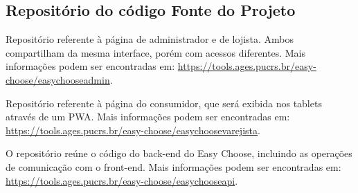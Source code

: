 \hypertarget{__RefHeading___Toc4733_3118176633}{}
\subsection{Repositório do código Fonte do Projeto\originalspace{}}
\label{ages-i:text-h-0008}

\indent \originaltab{}Repositório referente à página de administrador e de lojista. Ambos \originalinlinetab{}compartilham da mesma interface, porém com acessos diferentes. Mais informações podem ser encontradas em: \url{https://tools.ages.pucrs.br/easy-choose/easychooseadmin}.\par

\indent Repositório referente à página do consumidor, que será exibida nos tablets através de um PWA. Mais informações podem ser encontradas em: \url{https://tools.ages.pucrs.br/easy-choose/easychoosevarejista}.\par

\indent O repositório reúne o código do back-end do Easy Choose, incluindo as operações de comunicação com o front-end. Mais informações podem ser encontradas em: \url{https://tools.ages.pucrs.br/easy-choose/easychooseapi}.\par
